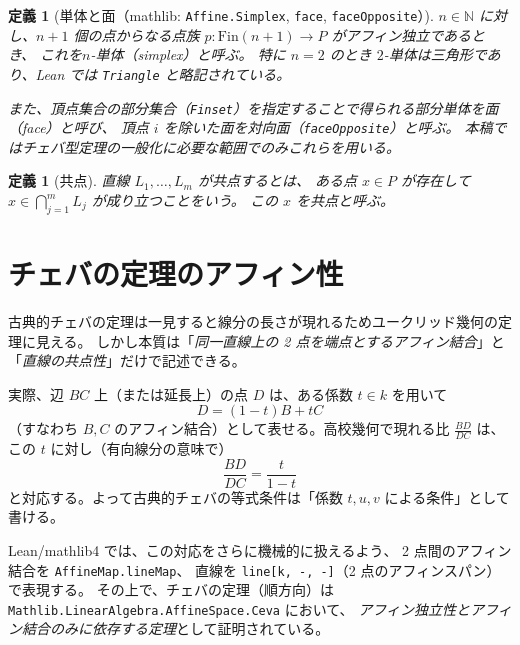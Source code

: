 \documentclass[a4paper,12pt]{bxjsbook}
\newlength{\customindent}
\newenvironment{body}{
  \par
  \begingroup
  \setlength{\leftskip}{\customindent}
  \setlength{\rightskip}{0pt}
  \setlength{\parindent}{1em}
  \setlength{\displayindent}{\customindent}
  \setlength{\displaywidth}{\dimexpr\linewidth-\customindent\relax}
}{
  \par
  \endgroup
}
\theoremstyle{theorem}
\newtheorem{definition}[theorem]{定義}
\begin{document}
    \begin{definition}[単体と面（mathlib: \texttt{Affine.Simplex}, \texttt{face}, \texttt{faceOpposite}）]
        $n\in\mathbb N$ に対し、$n+1$ 個の点からなる点族 $p:\mathrm{Fin}(n+1)\to P$ がアフィン独立であるとき、
        これを\emph{$n$-単体}（simplex）と呼ぶ。
        特に $n=2$ のとき $2$-単体は三角形であり、Lean では \texttt{Triangle} と略記されている。

        \indent また、頂点集合の部分集合（\texttt{Finset}）を指定することで得られる部分単体を\emph{面}（face）と呼び、
        頂点 $i$ を除いた面を\emph{対向面}（\texttt{faceOpposite}）と呼ぶ。
        本稿ではチェバ型定理の一般化に必要な範囲でのみこれらを用いる。
    \end{definition}

    \begin{definition}[共点]
        直線 $L_1,\dots,L_m$ が\emph{共点する}とは、
        ある点 $x\in P$ が存在して $x\in\bigcap_{j=1}^m L_j$ が成り立つことをいう。
        この $x$ を\emph{共点}と呼ぶ。
    \end{definition}

    \section{チェバの定理のアフィン性}\label{sec:ceva-affine}
    \begin{body}
        \indent 古典的チェバの定理は一見すると線分の長さが現れるためユークリッド幾何の定理に見える。
        しかし本質は「\emph{同一直線上の 2 点を端点とするアフィン結合}」と「\emph{直線の共点性}」だけで記述できる。

        \indent 実際、辺 $BC$ 上（または延長上）の点 $D$ は、ある係数 $t\in k$ を用いて
        \[
          D = (1-t)B + tC
        \]
        （すなわち $B,C$ のアフィン結合）として表せる。高校幾何で現れる比 $\frac{BD}{DC}$ は、
        この $t$ に対し（有向線分の意味で）
        \[
          \frac{BD}{DC} = \frac{t}{1-t}
        \]
        と対応する。よって古典的チェバの等式条件は「係数 $t,u,v$ による条件」として書ける。

        \indent Lean/mathlib4 では、この対応をさらに機械的に扱えるよう、
        2 点間のアフィン結合を \texttt{AffineMap.lineMap}、
        直線を \texttt{line[k, -, -]}（2 点のアフィンスパン）で表現する。
        その上で、チェバの定理（順方向）は \texttt{Mathlib.LinearAlgebra.AffineSpace.Ceva} において、
        \emph{アフィン独立性とアフィン結合のみに依存する定理}として証明されている。
    \end{body}
\end{document}
